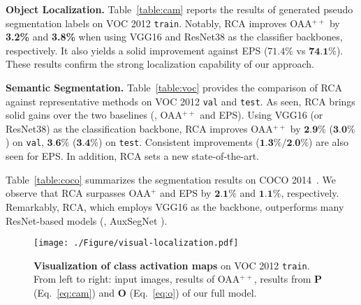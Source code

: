 \documentclass[10pt,twocolumn,letterpaper]{article}
\newcommand{\baseline}[1]{\color{ggray}{\scriptsize{{#1}}}}
\newcommand{\tablestyle}[2]{\setlength{\tabcolsep}{#1}\renewcommand{\arraystretch}{#2}\centering\footnotesize}
\begin{document}
\noindent\textbf{Object Localization.} Table~\ref{table:cam} reports the results of generated pseudo segmentation labels on  VOC 2012 \texttt{train}. Notably, RCA improves OAA$^{++}$ by \textbf{3.2\%} and {\textbf{3.8\%}} when using VGG16 and ResNet38 as the classifier backbones, respectively. It also yields a solid improvement against EPS ($71.4\%$ vs $\textbf{74.1\%}$). These results confirm the strong localization capability of our approach.




\noindent\textbf{Semantic Segmentation.} Table~\ref{table:voc} provides the comparison of RCA against representative methods on VOC 2012 \texttt{val} and \texttt{test}. As seen, RCA  brings solid gains over the two baselines (\ie, OAA$^{++}$ and EPS). Using VGG16 (or ResNet38) as the classification backbone, RCA improves OAA$^{++}$ by {$\textbf{2.9\%}$} ({$\textbf{3.0\%}$}) on \texttt{val},  {$\textbf{3.6\%}$} ({$\textbf{3.4\%}$}) on \texttt{test}. Consistent improvements ({$\textbf{1.3\%}/\textbf{2.0\%}$}) are also seen  for EPS. In addition, RCA{\baseline{+EPS}} sets a new state-of-the-art.




Table~\ref{table:coco} summarizes the segmentation results on  {COCO 2014}~\cite{lin2014microsoft}. We observe that RCA surpasses  OAA$^{+}$ and EPS  by {$\textbf{2.1\%}$}  and {$\textbf{1.1\%}$}, respectively. Remarkably, RCA{\baseline{+EPS}}, which employs VGG16 as the backbone, outperforms many ResNet-based models (\eg, AuxSegNet \cite{xu2021leveraging}).


\begin{figure}[t]
	\centering
	\texttt{[image: ./Figure/visual-localization.pdf]}
	\vspace{-18pt}
	\captionsetup{font=small}
	\caption{\small\textbf{Visualization of class activation maps} on VOC 2012 \texttt{train}. From left to right: input images, results of OAA$^{++}$, results from $\bm{P}$ (Eq.~\ref{eq:cam}) and $\bm{O}$ (Eq.~\ref{eq:o}) of our full model.}
	\label{fig:cam}
	\vspace{-6pt}
\end{figure}


\newcommand{\std}[1]{{\fontsize{5pt}{1em}\selectfont ~~$_\pm$$_{\text{#1}}$}}
\newcommand{\res}[3]{
	\tablestyle{1pt}{1}
	\begin{tabular}{z{16}y{18}}
		{#1} &
		\fontsize{7.5pt}{1em}\selectfont{~(${#2}${{#3}})}
\end{tabular}}
\end{document}
